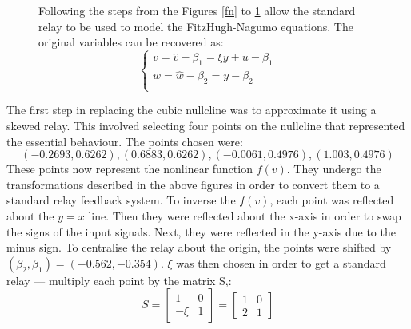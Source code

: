 \documentclass[a4paper, 12pt]{article}
\begin{document}
\begin{appendices}
\begin{figure}[h!]
\begin{minipage}[t]{.4\textwidth}
\begin{tikzpicture}[auto, node distance=2cm,>=latex]
\end{tikzpicture}
\label{fn_final_block}
\end{minipage}
\hspace{0.5cm}
\begin{minipage}[t]{.4\textwidth}\vspace{-2cm}\small
Following the steps from the Figures \ref{fn} to \ref{fn_final_block} allow the standard relay to be used to model the FitzHugh-Nagumo equations. The original variables can be recovered as: 
\begin{equation*}
\begin{cases}
v = \hat{v}-\beta_1 = \xi y + u - \beta_1 \\
w = \hat{w}-\beta_2 = y - \beta_2 \\
\end{cases}
\end{equation*}
\end{minipage}
\end{figure}


\newpage
The first step in replacing the cubic nullcline was to approximate it using a skewed relay. This involved selecting four points on the nullcline that represented the essential behaviour. The points chosen were: 
\begin{equation}
(-0.2693,0.6262),(0.6883,0.6262),(-0.0061,0.4976),(1.003,0.4976)
\end{equation}
These points now represent the nonlinear function $f(v)$. They undergo the transformations described in the above figures in order to convert them to a standard relay feedback system. To inverse the $f(v)$, each point was reflected about the $y=x$ line. Then they were reflected about the x-axis in order to swap the signs of the input signals. Next, they were reflected in the y-axis due to the minus sign. To centralise the relay about the origin, the points were shifted by $(\beta_2,\beta_1) = (-0.562,-0.354)$. $\xi$ was then chosen in order to get a standard relay --- multiply each point by the matrix S,:
\begin{equation}
S = \begin{bmatrix}
1 & 0 \\ -\xi & 1 
\end{bmatrix}  = \begin{bmatrix}
1 & 0 \\ 2 & 1 
\end{bmatrix}
\end{equation}  


\end{appendices}
\end{document}
